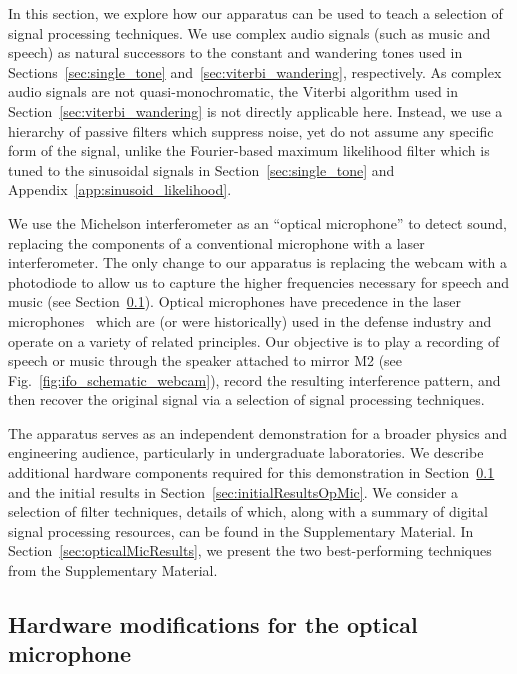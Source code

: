 \documentclass[paper-main.tex]{subfiles}
\begin{document}
In this section, we explore how our apparatus can be used to teach a selection of signal processing techniques. 
We use complex audio signals (such as music and speech) as natural successors to the constant and wandering tones used in Sections~\ref{sec:single_tone} and~\ref{sec:viterbi_wandering}, respectively.
As complex audio signals are not quasi-monochromatic, the Viterbi algorithm used in Section~\ref{sec:viterbi_wandering} is not directly applicable here. 
Instead, we use a hierarchy of passive filters which suppress noise, yet do not assume any specific form of the signal, unlike the Fourier-based maximum likelihood filter which is tuned to the sinusoidal signals in Section~\ref{sec:single_tone} and Appendix~\ref{app:sinusoid_likelihood}.


We use the Michelson interferometer as an ``optical microphone'' to detect sound, replacing the components of a conventional microphone with a laser interferometer.
The only change to our apparatus is replacing the webcam with a photodiode to allow us to capture the higher frequencies necessary for speech and music (see Section~\ref{sec:photodiode}). 
Optical microphones have precedence in the laser microphones~\cite{laser_microphone} which are (or were historically) used in the defense industry and operate on a variety of related principles. 
Our objective is to play a recording of speech or music through the speaker attached to mirror M2 (see Fig.~\ref{fig:ifo_schematic_webcam}), record the resulting interference pattern, and then recover the original signal via a selection of signal processing techniques. 


The apparatus serves as an independent demonstration for a broader physics and engineering audience, particularly in undergraduate laboratories. 
We describe additional hardware components required for this demonstration in Section~\ref{sec:photodiode} and the initial results in Section~\ref{sec:initialResultsOpMic}. 
We consider a selection of filter techniques, details of which, along with a summary of digital signal processing resources, can be found in the Supplementary Material. 
In Section~\ref{sec:opticalMicResults}, we present the two best-performing techniques from the Supplementary Material. 


\subsection{Hardware modifications for the optical microphone}
\label{sec:photodiode}
\end{document}
